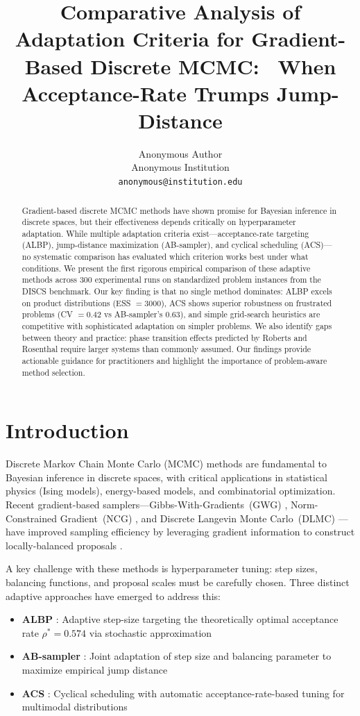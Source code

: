 \documentclass{article}
\title{Comparative Analysis of Adaptation Criteria for Gradient-Based Discrete MCMC: \
When Acceptance-Rate Trumps Jump-Distance}
\author{
  Anonymous Author \\
  Anonymous Institution \\
  \texttt{anonymous@institution.edu}
}
\begin{document}
\maketitle

\begin{abstract}
Gradient-based discrete MCMC methods have shown promise for Bayesian inference in discrete spaces, but their effectiveness depends critically on hyperparameter adaptation. While multiple adaptation criteria exist---acceptance-rate targeting (ALBP), jump-distance maximization (AB-sampler), and cyclical scheduling (ACS)---no systematic comparison has evaluated which criterion works best under what conditions. We present the first rigorous empirical comparison of these adaptive methods across 300 experimental runs on standardized problem instances from the DISCS benchmark. Our key finding is that no single method dominates: ALBP excels on product distributions (ESS $= 3000$), ACS shows superior robustness on frustrated problems (CV $= 0.42$ vs AB-sampler's $0.63$), and simple grid-search heuristics are competitive with sophisticated adaptation on simpler problems. We also identify gaps between theory and practice: phase transition effects predicted by Roberts and Rosenthal require larger systems than commonly assumed. Our findings provide actionable guidance for practitioners and highlight the importance of problem-aware method selection.
\end{abstract}

\section{Introduction}

Discrete Markov Chain Monte Carlo (MCMC) methods are fundamental to Bayesian inference in discrete spaces, with critical applications in statistical physics (Ising models), energy-based models, and combinatorial optimization. Recent gradient-based samplers---Gibbs-With-Gradients~(GWG) \citep{grathwohl2021oops}, Norm-Constrained Gradient~(NCG) \citep{rhodes2022enhanced}, and Discrete Langevin Monte Carlo~(DLMC) \citep{sun2022dlmc}---have improved sampling efficiency by leveraging gradient information to construct locally-balanced proposals \citep{zanella2020informed}.

A key challenge with these methods is hyperparameter tuning: step sizes, balancing functions, and proposal scales must be carefully chosen. Three distinct adaptive approaches have emerged to address this:
\begin{itemize}
    \item \textbf{ALBP} \citep{sun2022optimal}: Adaptive step-size targeting the theoretically optimal acceptance rate $\rho^* = 0.574$ via stochastic approximation
    \item \textbf{AB-sampler} \citep{sun2023anyscale}: Joint adaptation of step size and balancing parameter to maximize empirical jump distance
    \item \textbf{ACS} \citep{pynadath2024gradient}: Cyclical scheduling with automatic acceptance-rate-based tuning for multimodal distributions
\end{itemize}
\end{document}

